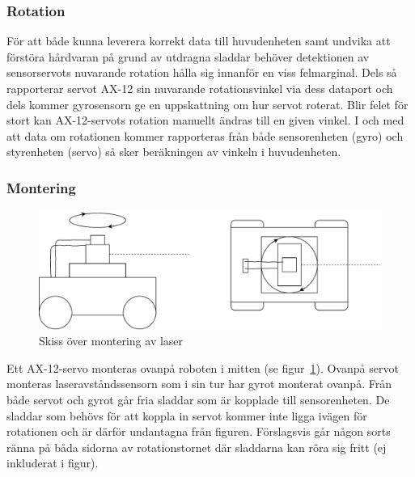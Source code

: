 \documentclass{article}
\begin{document}
\subsubsection{Rotation}
För att både kunna leverera korrekt data till huvudenheten samt undvika att förstöra hårdvaran på grund av utdragna sladdar behöver detektionen av sensorservots nuvarande rotation hålla sig innanför en viss felmarginal. Dels så rapporterar servot AX-12 sin nuvarande rotationsvinkel via dess dataport och dels kommer gyrosensorn ge en uppskattning om hur servot roterat. Blir felet för stort kan AX-12-servots rotation manuellt ändras till en given vinkel. I och med att data om rotationen kommer rapporteras från både sensorenheten (gyro) och styrenheten (servo) så sker beräkningen av vinkeln i huvudenheten.

\subsubsection{Montering}
\begin{figure}[H]
\centering
\includegraphics[scale=0.45]{Montering}
\caption{Skiss över montering av laser}
\label{fig:montering}
\end{figure}
Ett AX-12-servo monteras ovanpå roboten i mitten (se figur~\ref{fig:montering}). Ovanpå servot monteras laseravståndssensorn som i sin tur har gyrot monterat ovanpå. Från både servot och gyrot går fria sladdar som är kopplade till sensorenheten. De sladdar som behövs för att koppla in servot kommer inte ligga ivägen för rotationen och är därför undantagna från figuren. Förslagsvis går någon sorts ränna på båda sidorna av rotationstornet där sladdarna kan röra sig fritt (ej inkluderat i figur).
\end{document}
